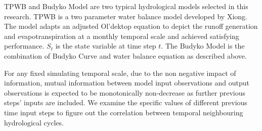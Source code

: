 \documentclass[11pt]{article}
\begin{document}
%
TPWB and Budyko Model are two typical hydrological models selected in this research. 
TPWB is a two parameter water balance model developed by Xiong\cite{xiong1999two}. The model adapts an adjusted Ol'dektop equation\cite{jobson1982evaporation} to depict the runoff generation and evapotranspiration at a monthly temporal scale and achieved satisfying performance. $S_t$ is the state variable at time step $t$. The Budyko Model is the combination of Budyko Curve and water balance equation as described above. %

 
For any fixed simulating temporal scale, due to the non negative impact of information, mutual information between model input observations and output observations is expected to be monotonically non-decrease as further previous steps' inputs are included. We examine the specific values of different previous time input steps to figure out the correlation between temporal neighbouring hydrological cycles. 
\end{document}
